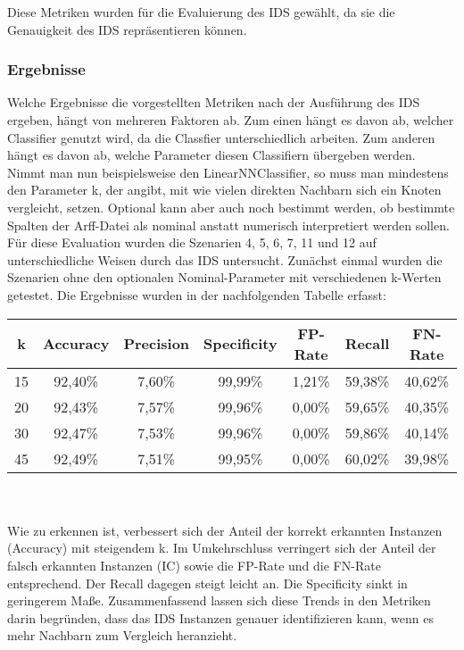 \documentclass[main.tex]{subfiles}
\begin{document}
Diese Metriken wurden für die Evaluierung des IDS gewählt, da sie die Genauigkeit des IDS repräsentieren können. 

\subsubsection{Ergebnisse}
Welche Ergebnisse die vorgestellten Metriken nach der Ausführung des IDS ergeben, hängt von mehreren Faktoren ab. 
Zum einen hängt es davon ab, welcher Classifier genutzt wird, da die Classfier unterschiedlich arbeiten. Zum anderen hängt es davon ab, welche Parameter diesen Classifiern übergeben werden. 
Nimmt man nun beispielsweise den LinearNNClassifier, so muss man mindestens den Parameter k, der angibt, mit wie vielen direkten Nachbarn sich ein Knoten vergleicht, setzen. Optional kann aber auch noch bestimmt werden, ob bestimmte Spalten der Arff-Datei als nominal anstatt numerisch interpretiert werden sollen. 
Für diese Evaluation wurden die Szenarien 4, 5, 6, 7, 11 und 12 auf unterschiedliche Weisen durch das IDS untersucht. Zunächst einmal wurden die Szenarien ohne den optionalen Nominal-Parameter mit verschiedenen k-Werten getestet. Die Ergebnisse wurden in der nachfolgenden Tabelle erfasst:\\

\begin{tabular}{|c|c|c|c|c|c|c|}\hline
k & Accuracy & Precision & Specificity & FP-Rate & Recall & FN-Rate \\ \hline
15 & 92,40\% & 7,60\% & 99,99\% & 1,21\% & 59,38\% & 40,62\% \\  \hline
20 & 92,43\% & 7,57\% & 99,96\% & 0,00\% & 59,65\% & 40,35\% \\  \hline
30 &  92,47\% & 7,53\% & 99,96\% & 0,00\% & 59,86\% & 40,14\% \\  \hline
45 & 92,49\% & 7,51\% & 99,95\% & 0,00\% & 60,02\% & 39,98\%\\  \hline
 \end{tabular} 

\ \\  \\ Wie zu erkennen ist, verbessert sich der Anteil der korrekt erkannten Instanzen (Accuracy) mit steigendem k. Im Umkehrschluss verringert sich der Anteil der falsch erkannten Instanzen (IC) sowie die FP-Rate und die FN-Rate entsprechend. Der Recall dagegen steigt leicht an. Die Specificity sinkt in geringerem Maße. Zusammenfassend lassen sich diese Trends in den Metriken darin begründen, dass das IDS Instanzen genauer identifizieren kann, wenn es mehr Nachbarn zum Vergleich heranzieht. 
\end{document}
